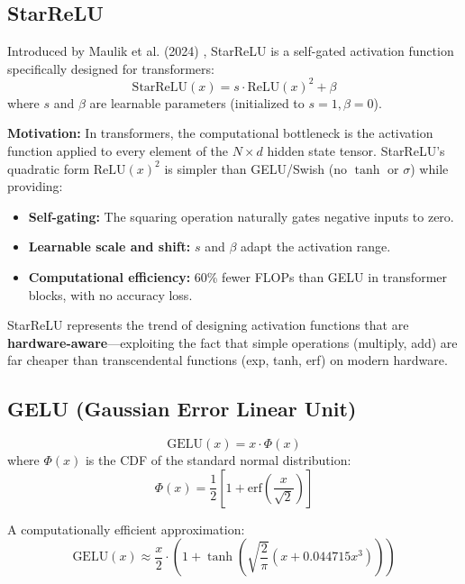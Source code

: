 \subsection{StarReLU}

Introduced by Maulik et al. (2024) \cite{maulik2024starrelu}, StarReLU is a self-gated activation function specifically designed for transformers:
\begin{equation}
\text{StarReLU}(x) = s \cdot \text{ReLU}(x)^2 + \beta
\end{equation}
where $s$ and $\beta$ are learnable parameters (initialized to $s = 1, \beta = 0$).

\textbf{Motivation:} In transformers, the computational bottleneck is the activation function applied to every element of the $N \times d$ hidden state tensor. StarReLU's quadratic form $\text{ReLU}(x)^2$ is simpler than GELU/Swish (no $\tanh$ or $\sigma$) while providing:
\begin{itemize}
    \item \textbf{Self-gating:} The squaring operation naturally gates negative inputs to zero.
    \item \textbf{Learnable scale and shift:} $s$ and $\beta$ adapt the activation range.
    \item \textbf{Computational efficiency:} 60\% fewer FLOPs than GELU in transformer blocks, with no accuracy loss.
\end{itemize}

StarReLU represents the trend of designing activation functions that are \textbf{hardware-aware}---exploiting the fact that simple operations (multiply, add) are far cheaper than transcendental functions (exp, tanh, erf) on modern hardware.

\subsection{GELU (Gaussian Error Linear Unit)}

\begin{equation}
\text{GELU}(x) = x \cdot \Phi(x)
\end{equation}
where $\Phi(x)$ is the CDF of the standard normal distribution:
\begin{equation}
\Phi(x) = \frac{1}{2}\left[1 + \text{erf}\left(\frac{x}{\sqrt{2}}\right)\right]
\end{equation}

A computationally efficient approximation:
\begin{equation}
\text{GELU}(x) \approx \frac{x}{2} \cdot \left(1 + \tanh\left(\sqrt{\frac{2}{\pi}}\left(x + 0.044715x^3\right)\right)\right)
\end{equation}

